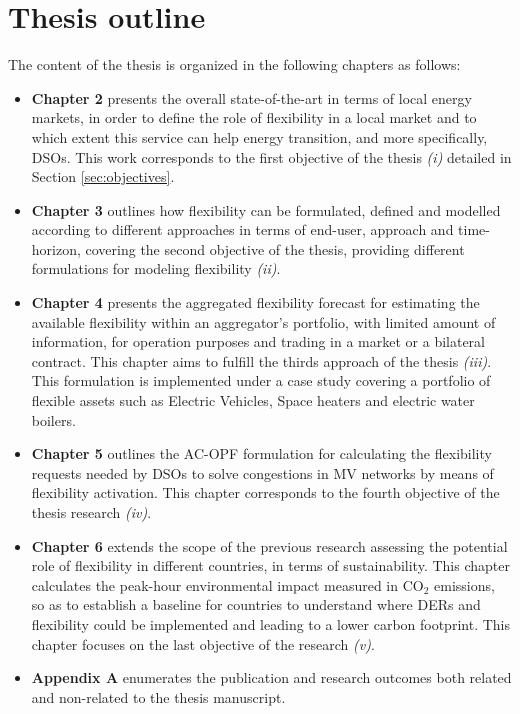 \section{Thesis outline}\label{sec:thesisoutline}
The content of the thesis is organized in the following chapters as follows:
\begin{itemize}
\item \textbf{Chapter 2} presents the overall state-of-the-art in terms of local energy markets, in order to define the role of flexibility in a local market and to which extent this service can help energy transition, and more specifically, DSOs. This work corresponds to the first objective of the thesis \textit{(i)} detailed in Section \ref{sec:objectives}. 
\item \textbf{Chapter 3} outlines how flexibility can be formulated, defined and modelled according to different approaches in terms of end-user, approach and time-horizon, covering the second objective of the thesis, providing different formulations for modeling flexibility \textit{(ii)}. 
\item \textbf{Chapter 4} presents the aggregated flexibility forecast for estimating the available flexibility within an aggregator's portfolio, with limited amount of information, for operation purposes and trading in a market or a bilateral contract. This chapter aims to fulfill the thirds approach of the thesis \textit{(iii)}. This formulation is implemented under a case study covering a portfolio of flexible assets such as Electric Vehicles, Space heaters and electric water boilers.  
\item \textbf{Chapter 5} outlines the AC-OPF formulation for calculating the flexibility requests needed by DSOs to solve congestions in MV networks by means of flexibility activation. This chapter corresponds to the fourth objective of the thesis research \textit{(iv)}.  
\item \textbf{Chapter 6} extends the scope of the previous research assessing the potential role of flexibility in different countries, in terms of sustainability. This chapter calculates the peak-hour environmental impact measured in CO$_2$ emissions, so as to establish a baseline for countries to understand where DERs and flexibility could be implemented and leading to a lower carbon footprint. This chapter focuses on the last objective of the research \textit{(v)}. 
\item \textbf{Appendix A} enumerates the publication and research outcomes both related and non-related to the thesis manuscript. 
\end{itemize}



